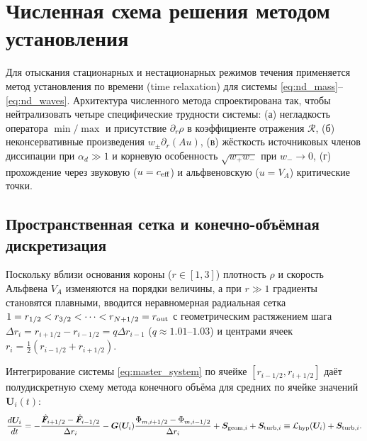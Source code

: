 \documentclass[11pt,a4paper]{article}
\begin{document}
\section{Численная схема решения методом установления}

Для отыскания стационарных и нестационарных режимов течения применяется метод установления по времени (time relaxation) для системы \eqref{eq:nd_mass}--\eqref{eq:nd_waves}. Архитектура численного метода спроектирована так, чтобы нейтрализовать четыре специфические трудности системы: (а) негладкость оператора $\min/\max$ и присутствие $\partial_r\rho$ в коэффициенте отражения $\mathcal{R}$, (б) неконсервативные произведения $w_\pm\partial_r(Au)$, (в) жёсткость источниковых членов диссипации при $\alpha_d \gg 1$ и корневую особенность $\sqrt{w_+ w_-}$ при $w_- \to 0$, (г) прохождение через звуковую ($u = c_{\rm eff}$) и альфвеновскую ($u = V_A$) критические точки.

\subsection{Пространственная сетка и конечно-объёмная дискретизация}

Поскольку вблизи основания короны ($r \in [1, 3]$) плотность $\rho$ и скорость Альфвена $V_A$ изменяются на порядки величины, а при $r \gg 1$ градиенты становятся плавными, вводится неравномерная радиальная сетка $1 = r_{1/2} < r_{3/2} < \dots < r_{N+1/2} = r_{\rm out}$ с геометрическим растяжением шага $\Delta r_i = r_{i+1/2} - r_{i-1/2} = q\Delta r_{i-1}$ ($q \approx 1.01\text{--}1.03$) и центрами ячеек $r_i = \frac{1}{2}(r_{i-1/2} + r_{i+1/2})$.

Интегрирование системы \eqref{eq:master_system} по ячейке $[r_{i-1/2}, r_{i+1/2}]$ даёт полудискретную схему метода конечного объёма для средних по ячейке значений $\bm{U}_i(t)$:
\begin{equation}
\frac{d\bm{U}_i}{dt} = -\frac{\hat{\bm{F}}_{i+1/2} - \hat{\bm{F}}_{i-1/2}}{\Delta r_i} - \bm{G}(\bm{U}_i)\frac{\Phi_{m,i+1/2} - \Phi_{m,i-1/2}}{\Delta r_i} + \bm{S}_{{\rm geom},i} + \bm{S}_{{\rm turb},i} \equiv \mathcal{L}_{\rm hyp}(\bm{U}_i) + \bm{S}_{{\rm turb},i}.
\label{eq:fvm_semidiscrete}
\end{equation}
\end{document}
